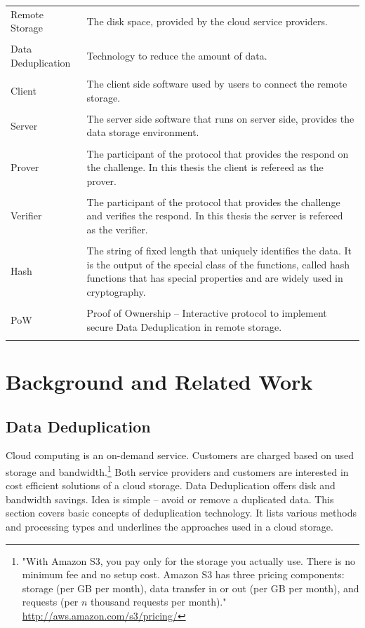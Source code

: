 \documentclass[12pt]{article}
\begin{document}
\begin{tabular}{L{4cm}L{12cm}}
Remote Storage & The disk space, provided by the cloud service providers.\\\\
Data Deduplication& Technology to reduce the amount of data.\\\\
Client&The client side software used by users to connect the remote storage.\\\\
Server&The server side software that runs on server side, provides the data storage environment.\\\\
Prover&The participant of the protocol that provides the respond on the challenge. In this thesis the client is refereed as the prover.\\\\
Verifier&The participant of the protocol that provides the challenge and verifies the respond. In this thesis the server is refereed as the verifier.\\\\
Hash& The string of fixed length that uniquely identifies the data. It is the output of the special class of the functions, called hash functions that has special properties and are widely used in cryptography.\\\\
PoW& Proof of Ownership -- Interactive protocol to implement secure Data Deduplication in remote storage.\\\\

\end{tabular}


\pagebreak
\section{Background and Related Work}
\label{sec:3}
\subsection{Data Deduplication}
\label{sub:Deduplication}
Cloud computing is an on-demand service. Customers are charged based on used storage and bandwidth.\footnote{"With Amazon S3, you pay only for the storage you actually use. There is no minimum fee and no setup cost. Amazon S3 has three pricing components: storage (per GB per month), data transfer in or out (per GB per month), and requests (per $n$ thousand requests per month)." \url{http://aws.amazon.com/s3/pricing/}} Both service providers and customers are interested in cost efficient solutions of a cloud storage. Data Deduplication offers disk and bandwidth savings. Idea is simple -- avoid or remove a duplicated data. This section covers basic concepts of deduplication technology. It lists various methods and processing types and underlines the approaches used in a cloud storage.
\end{document}
